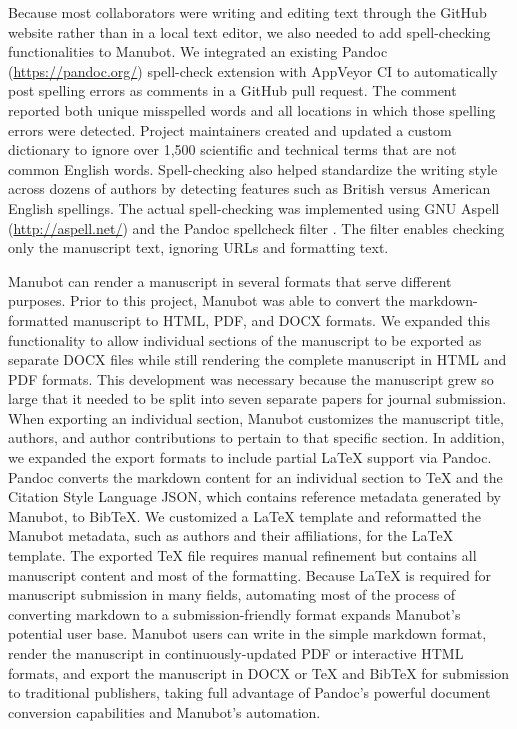 \documentclass[twocolumn]{ceurart}
\begin{document}
Because most collaborators were writing and editing text through the GitHub website rather than in a local text editor, we also needed to add spell-checking functionalities to Manubot.
We integrated an existing Pandoc (\url{https://pandoc.org/}) spell-check extension with AppVeyor CI to automatically post spelling errors as comments in a GitHub pull request.
The comment reported both unique misspelled words and all locations in which those spelling errors were detected.
Project maintainers created and updated a custom dictionary to ignore over 1,500 scientific and technical terms that are not common English words.
Spell-checking also helped standardize the writing style across dozens of authors by detecting features such as British versus American English spellings.
The actual spell-checking was implemented using GNU Aspell (\url{http://aspell.net/}) and the Pandoc spellcheck filter \citep{nTjoZqSQ}.
The filter enables checking only the manuscript text, ignoring URLs and formatting text.

Manubot can render a manuscript in several formats that serve different purposes.
Prior to this project, Manubot was able to convert the markdown-formatted manuscript to HTML, PDF, and DOCX formats.
We expanded this functionality to allow individual sections of the manuscript to be exported as separate DOCX files while still rendering the complete manuscript in HTML and PDF formats.
This development was necessary because the manuscript grew so large that it needed to be split into seven separate papers for journal submission.
When exporting an individual section, Manubot customizes the manuscript title, authors, and author contributions to pertain to that specific section.
In addition, we expanded the export formats to include partial LaTeX support via Pandoc.
Pandoc converts the markdown content for an individual section to TeX and the Citation Style Language JSON, which contains reference metadata generated by Manubot, to BibTeX.
We customized a LaTeX template and reformatted the Manubot metadata, such as authors and their affiliations, for the LaTeX template.
The exported TeX file requires manual refinement but contains all manuscript content and most of the formatting.
Because LaTeX is required for manuscript submission in many fields, automating most of the process of converting markdown to a submission-friendly format expands Manubot's potential user base.
Manubot users can write in the simple markdown format, render the manuscript in continuously-updated PDF or interactive HTML formats, and export the manuscript in DOCX or TeX and BibTeX for submission to traditional publishers, taking full advantage of Pandoc's powerful document conversion capabilities and Manubot's automation.
\end{document}
